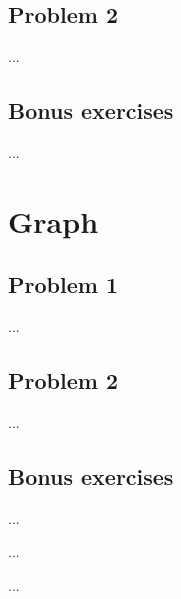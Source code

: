 \documentclass[a4paper]{article}
\begin{document}
    \subsection{Problem 2}
    ...

    \subsection{Bonus exercises}
    ...



    \section{Graph}

    \subsection{Problem 1}
    ...

    \subsection{Problem 2}
    ...

    \subsection{Bonus exercises}
    ...

    \begin{thebibliography}{80}


        ...


        ...


    \end{thebibliography}
\end{document}
